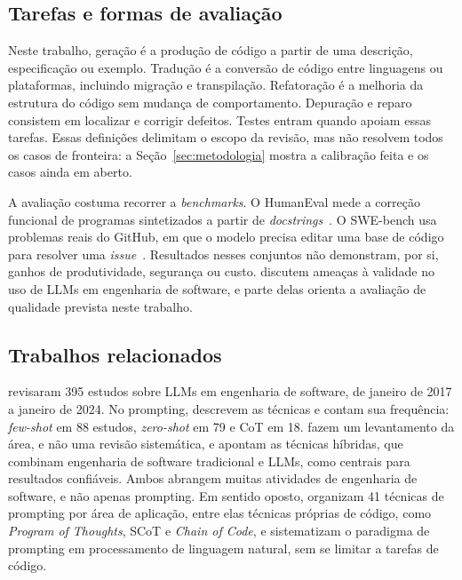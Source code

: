 \subsection{Tarefas e formas de avaliação}
Neste trabalho, geração é a produção de código a partir de uma descrição, especificação ou exemplo.
Tradução é a conversão de código entre linguagens ou plataformas, incluindo migração e transpilação.
Refatoração é a melhoria da estrutura do código sem mudança de comportamento. Depuração e reparo
consistem em localizar e corrigir defeitos. Testes entram quando apoiam essas tarefas. Essas
definições delimitam o escopo da revisão, mas não resolvem todos os casos de fronteira: a
Seção~\ref{sec:metodologia} mostra a calibração feita e os casos ainda em aberto.

A avaliação costuma recorrer a \textit{benchmarks}. O HumanEval mede a correção funcional de
programas sintetizados a partir de \textit{docstrings}~\citep{chen2021codex}. O SWE-bench usa
problemas reais do GitHub, em que o modelo precisa editar uma base de código para resolver uma
\textit{issue}~\citep{jimenez2024swebench}. Resultados nesses conjuntos não demonstram, por si,
ganhos de produtividade, segurança ou custo.  discutem
ameaças à validade no uso de LLMs em engenharia de software, e parte delas orienta a avaliação de
qualidade prevista neste trabalho.

\subsection{Trabalhos relacionados}
 revisaram 395 estudos sobre LLMs em engenharia de software, de janeiro de 2017 a
janeiro de 2024. No prompting, descrevem as técnicas e contam sua frequência: \textit{few-shot} em 88 estudos,
\textit{zero-shot} em 79 e CoT em 18.
 fazem um levantamento da área, e não uma revisão sistemática, e apontam as técnicas
híbridas, que combinam engenharia de software tradicional e LLMs, como centrais para resultados confiáveis.
Ambos abrangem muitas atividades de engenharia de software, e não apenas prompting.
Em sentido oposto,  organizam 41 técnicas de prompting por área de aplicação,
entre elas técnicas próprias de código, como \textit{Program of Thoughts}, SCoT e \textit{Chain of Code}, e
 sistematizam o paradigma de prompting em processamento de linguagem natural, sem se
limitar a tarefas de código.

